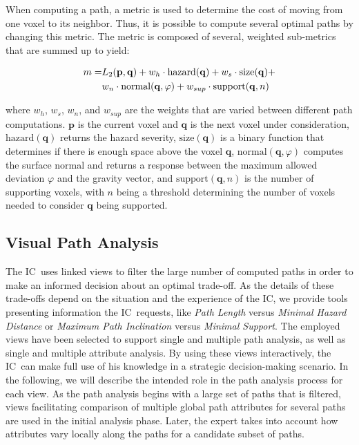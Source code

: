 \documentclass{egpubl}
\def\IC{IC}
\begin{document}
When computing a path, a metric is used to determine the cost of moving from one voxel to its neighbor. Thus, it is possible to compute several optimal paths by changing this metric. The metric is composed of several, weighted sub-metrics that are summed up to yield:

\begin{equation}
\begin{array}{r@{}l}
m = & L_2(\mathbf{p},\mathbf{q}) + w_h \cdot \textrm{hazard}(\mathbf{q}) + w_s \cdot \textrm{size}(\mathbf{q}) + \vspace*{0.1cm} \\
  & w_n \cdot \textrm{normal}(\mathbf{q},\varphi) + w_{sup} \cdot \textrm{support}(\mathbf{q},n)
\end{array}
\end{equation}

\noindent where $w_h$, $w_s$, $w_n$, and $w_{sup}$ are the weights that are varied between different path computations. $\mathbf{p}$ is the current voxel and $\mathbf{q}$ is the next voxel under consideration, $\textrm{hazard}(\mathbf{q})$ returns the hazard severity, $\textrm{size}(\mathbf{q})$ is a binary function that determines if there is enough space above the voxel $\mathbf{q}$, $\textrm{normal}(\mathbf{q},\varphi)$ computes the surface normal and returns a response between the maximum allowed deviation $\varphi$ and the gravity vector, and $\mathrm{support}(\mathbf{q},n)$ is the number of supporting voxels, with $n$ being a threshold determining the number of voxels needed to consider $\mathbf{q}$ being supported.

\subsection{Visual Path Analysis} \label{sec:overview:pathanalysis}
The \IC\ uses linked views to filter the large number of computed paths in order to make an informed decision about an optimal trade-off. As the details of these trade-offs depend on the situation and the experience of the \IC, we provide tools presenting information the \IC\ requests, like \emph{Path Length} versus \emph{Minimal Hazard Distance} or \emph{Maximum Path Inclination} versus \emph{Minimal Support}. The employed views have been selected to support single and multiple path analysis, as well as single and multiple attribute analysis. By using these views interactively, the \IC\ can make full use of his knowledge in a strategic decision-making scenario. In the following, we will describe the intended role in the path analysis process for each view. As the path analysis begins with a large set of paths that is filtered, views facilitating comparison of multiple global path attributes for several paths are used in the initial analysis phase. Later, the expert takes into account how attributes vary locally along the paths for a candidate subset of paths.
\end{document}
